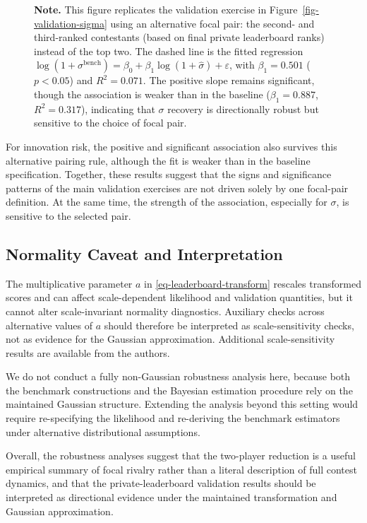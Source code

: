 \documentclass[mnsc]{informs3}
\begin{document}
\begin{figure}[tbp]
\begin{minipage}{\textwidth}
{\footnotesize
\textbf{Note.} This figure replicates the validation exercise in Figure~\ref{fig-validation-sigma} using an alternative focal pair: the second- and third-ranked contestants (based on final private leaderboard ranks) instead of the top two. The dashed line is the fitted regression $\log(1 + \sigma^{\mathrm{bench}}) = \beta_0 + \beta_1 \log(1 + \hat{\sigma}) + \varepsilon$, with $\beta_1 = 0.501$ ($p < 0.05$) and $R^2 = 0.071$. The positive slope remains significant, though the association is weaker than in the baseline ($\beta_1 = 0.887$, $R^2 = 0.317$), indicating that $\sigma$ recovery is directionally robust but sensitive to the choice of focal pair.
}
\end{minipage}
\end{figure}

For innovation risk, the positive and significant association also survives this alternative pairing rule, although the fit is weaker than in the baseline specification.
Together, these results suggest that the signs and significance patterns of the main validation exercises are not driven solely by one focal-pair definition. At the same time, the strength of the association, especially for $\sigma$, is sensitive to the selected pair.


\subsection{Normality Caveat and Interpretation}\label{sect-robust-normality}

The multiplicative parameter $a$ in \eqref{eq-leaderboard-transform} rescales transformed scores and can affect scale-dependent likelihood and validation quantities, but it cannot alter scale-invariant normality diagnostics. Auxiliary checks across alternative values of $a$ should therefore be interpreted as scale-sensitivity checks, not as evidence for the Gaussian approximation. Additional scale-sensitivity results are available from the authors.

We do not conduct a fully non-Gaussian robustness analysis here, because both the benchmark constructions and the Bayesian estimation procedure rely on the maintained Gaussian structure.
Extending the analysis beyond this setting would require re-specifying the likelihood and re-deriving the benchmark estimators under alternative distributional assumptions.

Overall, the robustness analyses suggest that the two-player reduction is a useful empirical summary of focal rivalry rather than a literal description of full contest dynamics, and that the private-leaderboard validation results should be interpreted as directional evidence under the maintained transformation and Gaussian approximation.
\end{document}
